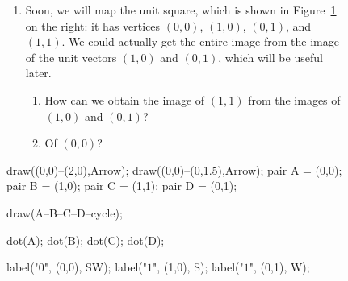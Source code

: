 \documentclass[../gatm.tex]{subfiles}
\begin{document}
\begin{figure}[h]
	\begin{center}
		\begin{minipage}[c]{0.55\textwidth}
			\begin{enumerate}
				\setcounter{enumi}{\value{mp_problem_i}}
				\item Soon, we will map the unit square, which is shown in Figure~\ref{fig:unit_square} on the right: it has vertices $(0,0)$, $(1,0)$, $(0,1)$, and $(1,1)$. We could actually get the entire image from the image of the unit vectors $(1,0)$ and $(0,1)$, which will be useful later.
				\begin{enumerate}
					\item How can we obtain the image of $(1,1)$ from the images of $(1,0)$ and $(0,1)$?
					\item Of $(0,0)$?
				\end{enumerate}
				\setcounter{mp_problem_i}{\value{enumi}}
			\end{enumerate}
		\end{minipage}
		\hfill
		\begin{minipage}[c]{0.35\textwidth}
			\begin{center}
				\begin{minipage}[b]{\textwidth}
					\centering
					\begin{asy}[width=0.7\textwidth]
					draw((0,0)--(2,0),Arrow);
					draw((0,0)--(0,1.5),Arrow);
					pair A = (0,0);
					pair B = (1,0);
					pair C = (1,1);
					pair D = (0,1);
					
					draw(A--B--C--D--cycle);
					
					dot(A);
					dot(B);
					dot(C);
					dot(D);
					
					label("$0$", (0,0), SW);
					label("$1$", (1,0), S);
					label("$1$", (0,1), W);
					\end{asy}
				\end{minipage}
			\end{center}
			\vspace*{-2\baselineskip}
			\begin{center}
				\begin{minipage}[t]{\textwidth}
					\label{fig:unit_square}
				\end{minipage}
			\end{center}
		\end{minipage}
	\end{center}
\end{figure}
\end{document}
